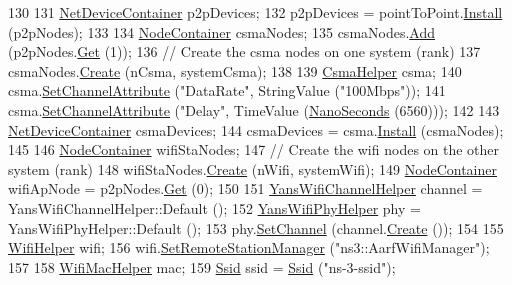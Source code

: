 \begin{DoxyCode}
130 
131   \hyperlink{classns3_1_1NetDeviceContainer}{NetDeviceContainer} p2pDevices;
132   p2pDevices = pointToPoint.\hyperlink{classns3_1_1PointToPointHelper_ab9162fea3e88722666fed1106df1f9ec}{Install} (p2pNodes);
133 
134   \hyperlink{classns3_1_1NodeContainer}{NodeContainer} csmaNodes;
135   csmaNodes.\hyperlink{classns3_1_1NodeContainer_aa60b3a0e70f2fb324e16ffcf8bf31fcb}{Add} (p2pNodes.\hyperlink{classns3_1_1NodeContainer_a9ed96e2ecc22e0f5a3d4842eb9bf90bf}{Get} (1));
136   \textcolor{comment}{// Create the csma nodes on one system (rank)}
137   csmaNodes.\hyperlink{classns3_1_1NodeContainer_a787f059e2813e8b951cc6914d11dfe69}{Create} (nCsma, systemCsma);
138 
139   \hyperlink{classns3_1_1CsmaHelper}{CsmaHelper} csma;
140   csma.\hyperlink{classns3_1_1CsmaHelper_a886d900b2fe44433e0b81752dea7e7f1}{SetChannelAttribute} (\textcolor{stringliteral}{"DataRate"}, StringValue (\textcolor{stringliteral}{"100Mbps"}));
141   csma.\hyperlink{classns3_1_1CsmaHelper_a886d900b2fe44433e0b81752dea7e7f1}{SetChannelAttribute} (\textcolor{stringliteral}{"Delay"}, TimeValue (\hyperlink{group__timecivil_ga281d64bcb4dad96267d83c7688ec433f}{NanoSeconds} (6560)));
142 
143   \hyperlink{classns3_1_1NetDeviceContainer}{NetDeviceContainer} csmaDevices;
144   csmaDevices = csma.\hyperlink{classns3_1_1CsmaHelper_af79a91372595230b0817200270ab84e7}{Install} (csmaNodes);
145 
146   \hyperlink{classns3_1_1NodeContainer}{NodeContainer} wifiStaNodes;
147   \textcolor{comment}{// Create the wifi nodes on the other system (rank)}
148   wifiStaNodes.\hyperlink{classns3_1_1NodeContainer_a787f059e2813e8b951cc6914d11dfe69}{Create} (nWifi, systemWifi);
149   \hyperlink{classns3_1_1NodeContainer}{NodeContainer} wifiApNode = p2pNodes.\hyperlink{classns3_1_1NodeContainer_a9ed96e2ecc22e0f5a3d4842eb9bf90bf}{Get} (0);
150 
151   \hyperlink{classns3_1_1YansWifiChannelHelper}{YansWifiChannelHelper} channel = YansWifiChannelHelper::Default ();
152   \hyperlink{classns3_1_1YansWifiPhyHelper}{YansWifiPhyHelper} phy = YansWifiPhyHelper::Default ();
153   phy.\hyperlink{classns3_1_1YansWifiPhyHelper_ad2e9a27587dd4ff320435c93cc2676de}{SetChannel} (channel.\hyperlink{classns3_1_1YansWifiChannelHelper_a0532e292ab9452f3cf630c848708e563}{Create} ());
154 
155   \hyperlink{classns3_1_1WifiHelper}{WifiHelper} wifi;
156   wifi.\hyperlink{classns3_1_1WifiHelper_a3d01b178aeb2de246ab5a3aa5638ce24}{SetRemoteStationManager} (\textcolor{stringliteral}{"ns3::AarfWifiManager"});
157 
158   \hyperlink{classns3_1_1WifiMacHelper}{WifiMacHelper} mac;
159   \hyperlink{classns3_1_1Ssid}{Ssid} ssid = \hyperlink{classns3_1_1Ssid}{Ssid} (\textcolor{stringliteral}{"ns-3-ssid"});

\end{DoxyCode}
